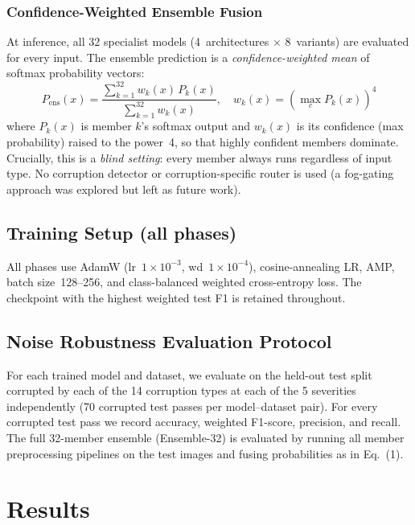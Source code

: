 \documentclass[conference]{IEEEtran}
\begin{document}
\subsubsection{Confidence-Weighted Ensemble Fusion}
At inference, all 32 specialist models (4~architectures $\times$ 8~variants) are evaluated for every input. The ensemble prediction is a \emph{confidence-weighted mean} of softmax probability vectors:
\begin{equation}
    P_{\text{ens}}(x) = \frac{\sum_{k=1}^{32} w_k(x)\, P_k(x)}{\sum_{k=1}^{32} w_k(x)}, \quad w_k(x) = \left(\max_c P_k(x)\right)^4
\end{equation}
where $P_k(x)$ is member $k$'s softmax output and $w_k(x)$ is its confidence (max probability) raised to the power~4, so that highly confident members dominate. Crucially, this is a \emph{blind setting}: every member always runs regardless of input type. No corruption detector or corruption-specific router is used (a fog-gating approach was explored but left as future work).

\subsection{Training Setup (all phases)}
All phases use AdamW (lr~$1{\times}10^{-3}$, wd~$1{\times}10^{-4}$), cosine-annealing LR, AMP, batch size~128--256, and class-balanced weighted cross-entropy loss. The checkpoint with the highest weighted test F1 is retained throughout.

\subsection{Noise Robustness Evaluation Protocol}
For each trained model and dataset, we evaluate on the held-out test split corrupted by each of the 14 corruption types at each of the 5 severities independently (70 corrupted test passes per model--dataset pair). For every corrupted test pass we record accuracy, weighted F1-score, precision, and recall. The full 32-member ensemble (Ensemble-32) is evaluated by running all member preprocessing pipelines on the test images and fusing probabilities as in Eq.~(1).

\section{Results}
\label{sec:results}
\end{document}

